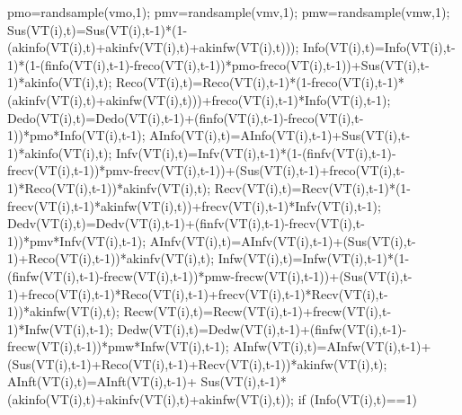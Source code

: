                                           pmo=randsample(vmo,1);
                                          pmv=randsample(vmv,1); 
                                          pmw=randsample(vmw,1);                                        
                                          Sus(VT(i),t)=Sus(VT(i),t-1)*(1-(akinfo(VT(i),t)+akinfv(VT(i),t)+akinfw(VT(i),t)));
                                          Info(VT(i),t)=Info(VT(i),t-1)*(1-(finfo(VT(i),t-1)-freco(VT(i),t-1))*pmo-freco(VT(i),t-1))+Sus(VT(i),t-1)*akinfo(VT(i),t);
                                          Reco(VT(i),t)=Reco(VT(i),t-1)*(1-freco(VT(i),t-1)*(akinfv(VT(i),t)+akinfw(VT(i),t)))+freco(VT(i),t-1)*Info(VT(i),t-1);
                                          Dedo(VT(i),t)=Dedo(VT(i),t-1)+(finfo(VT(i),t-1)-freco(VT(i),t-1))*pmo*Info(VT(i),t-1);
                                          AInfo(VT(i),t)=AInfo(VT(i),t-1)+Sus(VT(i),t-1)*akinfo(VT(i),t);                              
                                          Infv(VT(i),t)=Infv(VT(i),t-1)*(1-(finfv(VT(i),t-1)-frecv(VT(i),t-1))*pmv-frecv(VT(i),t-1))+(Sus(VT(i),t-1)+freco(VT(i),t-1)*Reco(VT(i),t-1))*akinfv(VT(i),t);
                                          Recv(VT(i),t)=Recv(VT(i),t-1)*(1-frecv(VT(i),t-1)*akinfw(VT(i),t))+frecv(VT(i),t-1)*Infv(VT(i),t-1);
                                          Dedv(VT(i),t)=Dedv(VT(i),t-1)+(finfv(VT(i),t-1)-frecv(VT(i),t-1))*pmv*Infv(VT(i),t-1);
                                          AInfv(VT(i),t)=AInfv(VT(i),t-1)+(Sus(VT(i),t-1)+Reco(VT(i),t-1))*akinfv(VT(i),t);
                                          Infw(VT(i),t)=Infw(VT(i),t-1)*(1-(finfw(VT(i),t-1)-frecw(VT(i),t-1))*pmw-frecw(VT(i),t-1))+(Sus(VT(i),t-1)+freco(VT(i),t-1)*Reco(VT(i),t-1)+frecv(VT(i),t-1)*Recv(VT(i),t-1))*akinfw(VT(i),t);
                                          Recw(VT(i),t)=Recw(VT(i),t-1)+frecw(VT(i),t-1)*Infw(VT(i),t-1);
                                          Dedw(VT(i),t)=Dedw(VT(i),t-1)+(finfw(VT(i),t-1)-frecw(VT(i),t-1))*pmw*Infw(VT(i),t-1);
                                          AInfw(VT(i),t)=AInfw(VT(i),t-1)+(Sus(VT(i),t-1)+Reco(VT(i),t-1)+Recv(VT(i),t-1))*akinfw(VT(i),t);                                           
                                          AInft(VT(i),t)=AInft(VT(i),t-1)+ Sus(VT(i),t-1)*(akinfo(VT(i),t)+akinfv(VT(i),t)+akinfw(VT(i),t));
                                          if (Info(VT(i),t)==1)
                                             
